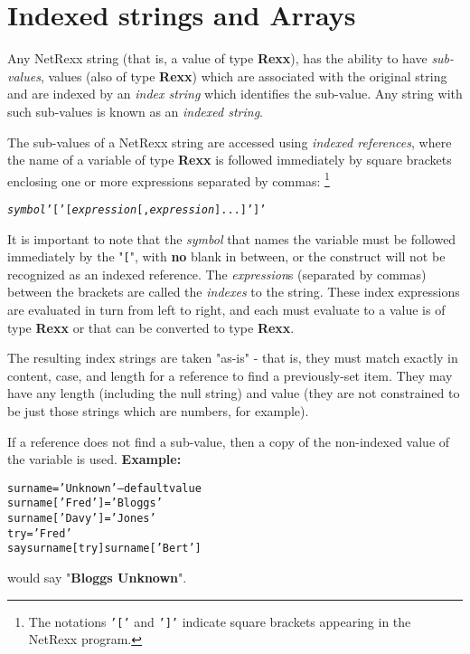 \chapter{Indexed strings and Arrays}\label{"id"}
 
Any NetRexx string (that is, a value of type \textbf{Rexx}), has the
ability to have \emph{sub-values}, values (also of type \textbf{Rexx})
which are associated with the original string and are indexed by an
\emph{index string} which identifies the sub-value.
Any string with such sub-values is known as an \emph{indexed string}.
 
The sub-values of a NetRexx string are accessed using \emph{indexed
references}, where the name of a variable of type \textbf{Rexx} is
followed immediately by square brackets enclosing one or more
expressions separated by commas:
\footnote{
The notations \texttt{'['} and \texttt{']'}
indicate square brackets appearing in the NetRexx program.
}
\begin{shaded}
\begin{alltt}
\emph{symbol}'['[\emph{expression}[, \emph{expression}]...]']'
\end{alltt}
\end{shaded}
It is important to note that the \emph{symbol} that names the
variable must be followed immediately by the "\texttt{[}",
with \textbf{no} blank in between, or the construct will not be
recognized as an indexed reference.
 The \emph{expression}s (separated by commas) between the
brackets are called the \emph{indexes} to the string.
These index expressions are evaluated in turn from left to right, and
each must evaluate to a value is of type \textbf{Rexx} or that can be
converted to type \textbf{Rexx}.
 
The resulting index strings are taken "as-is" - that is, they
must match exactly in content, case, and length for a reference to find
a previously-set item.
They may have any length (including the null string) and value (they are
not constrained to be just those strings which are numbers, for
example).
 
If a reference does not find a sub-value, then a copy of the non-indexed
value of the variable is used.
 \textbf{Example:}
\begin{alltt}
surname='Unknown'         -- default value
surname['Fred']='Bloggs'
surname['Davy']='Jones'
try='Fred'
say surname[try] surname['Bert']
\end{alltt}
would say "\textbf{Bloggs Unknown}".
 
